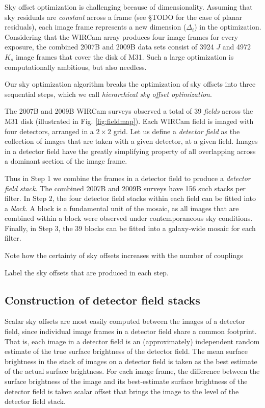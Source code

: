 \documentclass[iop]{emulateapj}
\newcommand{\todo}[1]{\textcolor{RedOrange}{#1}} %
\begin{document}
Sky offset optimization is challenging because of dimensionality. Assuming that sky residuals are \emph{constant} across a frame (see \S TODO for the case of planar residuals), each image frame represents a new dimension ($\Delta_i$) in the optimization. Considering that the WIRCam array produces four image frames for every exposure, the combined 2007B and 2009B data sets consist of 3924 $J$ and 4972 $K_s$ image frames that cover the disk of M31. Such a large optimization is computationally ambitious, but also needless.

Our sky optimization algorithm breaks the optimization of sky offsets into three sequential steps, which we call \emph{hierarchical sky offset optimization}.

The 2007B and 2009B WIRCam surveys observed a total of 39 \emph{fields} across the M31 disk (illustrated in Fig. \ref{fig:fieldmap}). Each WIRCam field is imaged with four detectors, arranged in a $2\times 2$ grid. Let us define a \emph{detector field} as the collection of images that are taken with a given detector, at a given field. Images in a detector field have the greatly simplifying property of all overlapping across a dominant section of the image frame.

Thus in Step 1 we combine the frames in a detector field to produce a \emph{detector field stack}. The combined 2007B and 2009B surveys have 156 such stacks per filter. In Step 2, the four detector field stacks within each field can be fitted into a \emph{block}. A block is a fundamental unit of the mosaic, as all images that are combined within a block were observed under contemporaneous sky conditions. Finally, in Step 3, the 39 blocks can be fitted into a galaxy-wide mosaic for each filter.

\todo{Note how the certainty of sky offsets increases with the number of couplings}

\todo{Label the sky offsets that are produced in each step.}

\subsection{Construction of detector field stacks}
\label{sec:stacks}

Scalar sky offsets are most easily computed between the images of a detector field, since individual image frames in a detector field share a common footprint. That is, each image in a detector field is an (approximately) independent random estimate of the true surface brightness of the detector field. The mean surface brightness in the stack of images on a detector field is taken as the best estimate of the actual surface brightness. For each image frame, the difference between the surface brightness of the image and its best-estimate surface brightness of the detector field is taken scalar offset that brings the image to the level of the detector field stack.
\end{document}
